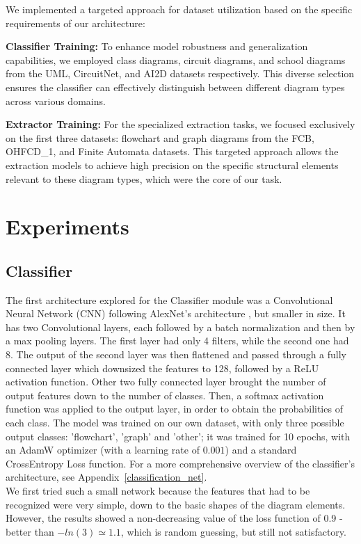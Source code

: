 \documentclass[conference]{IEEEtran}
\begin{document}
We implemented a targeted approach for dataset utilization based on the specific requirements of our architecture:

\textbf{Classifier Training:} To enhance model robustness and generalization capabilities, we employed class diagrams, circuit diagrams, and school diagrams from the UML, CircuitNet, and AI2D datasets respectively. This diverse selection ensures the classifier can effectively distinguish between different diagram types across various domains.

\textbf{Extractor Training:} For the specialized extraction tasks, we focused exclusively on the first three datasets: flowchart and graph diagrams from the FCB, OHFCD\_1, and Finite Automata datasets. This targeted approach allows the extraction models to achieve high precision on the specific structural elements relevant to these diagram types, which were the core of our task.


\section{Experiments}

\subsection{Classifier}
\label{exp:classifier}
The first architecture explored for the Classifier module was a Convolutional Neural Network (CNN) following AlexNet's architecture \cite{alexnet}, but smaller in size.
It has two Convolutional layers, each followed by a batch normalization and then by a max pooling layers. The first layer had only 4 filters, while the second one had 8.
The output of the second layer was then flattened and passed through a fully connected layer which downsized the features to 128, followed by a ReLU activation function. Other two fully connected layer brought the number of output features down to the number of classes.
Then, a softmax activation function was applied to the output layer, in order to obtain the probabilities of each class.
The model was trained on our own dataset, with only three possible output classes: 'flowchart', 'graph' and 'other'; it was trained for 10 epochs, with an AdamW optimizer (with a learning rate of $0.001$) and a standard CrossEntropy Loss function. For a more comprehensive overview of the classifier's architecture, see Appendix~\ref{classification_net}.
\\

We first tried such a small network because the features that had to be recognized were very simple, down to the basic shapes of the diagram elements.
However, the results showed a non-decreasing value of the loss function of 0.9 - better than $-ln(3) \simeq 1.1$, which is random guessing, but still not satisfactory.
\\
\end{document}
